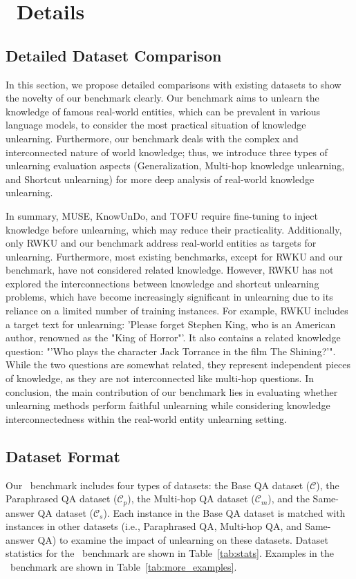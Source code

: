 \section{\ourdata~Details}
\label{apx:sup_detail}



\subsection{Detailed Dataset Comparison}
\label{apx:dataset_comparison}
In this section, we propose detailed comparisons with existing datasets to show the novelty of our benchmark clearly. 
Our benchmark aims to unlearn the knowledge of famous real-world entities, which can be prevalent in various language models, to consider the most practical situation of knowledge unlearning. Furthermore, our benchmark deals with the complex and interconnected nature of world knowledge; thus, we introduce three types of unlearning evaluation aspects (Generalization, Multi-hop knowledge unlearning, and Shortcut unlearning) for more deep analysis of real-world knowledge unlearning. 

In summary, MUSE, KnowUnDo, and TOFU require fine-tuning to inject knowledge before unlearning, which may reduce their practicality.
Additionally, only RWKU and our benchmark address real-world entities as targets for unlearning. Furthermore, most existing benchmarks, except for RWKU and our benchmark, have not considered related knowledge.
However, RWKU has not explored the interconnections between knowledge and shortcut unlearning problems, which have become increasingly significant in unlearning due to its reliance on a limited number of training instances.
For example, RWKU includes a target text for unlearning: 'Please forget Stephen King, who is an American author, renowned as the "King of Horror"'. It also contains a related knowledge question: "'Who plays the character Jack Torrance in the film The Shining?'". While the two questions are somewhat related, they represent independent pieces of knowledge, as they are not interconnected like multi-hop questions.
In conclusion, the main contribution of our benchmark lies in evaluating whether unlearning methods perform faithful unlearning while considering knowledge interconnectedness within the real-world entity unlearning setting.





\subsection{Dataset Format}
Our \ourdata~benchmark includes four types of datasets: the Base QA dataset ($\mathcal{C}$), the Paraphrased QA dataset ($\mathcal{C}_{p}$), the Multi-hop QA dataset ($\mathcal{C}_{m}$), and the Same-answer QA dataset ($\mathcal{C}_{s}$).
Each instance in the Base QA dataset is matched with instances in other datasets (i.e., Paraphrased QA, Multi-hop QA, and Same-answer QA) to examine the impact of unlearning on these datasets.
Dataset statistics for the \ourdata~benchmark are shown in Table~\ref{tab:stats}.
Examples in the \ourdata~benchmark are shown in Table~\ref{tab:more_examples}.

